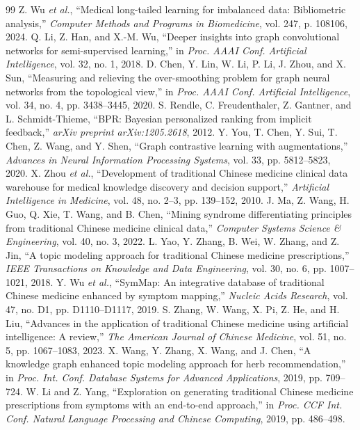 \documentclass[journal,twoside,web]{ieeecolor}
\begin{document}
\begin{thebibliography}{99}
 Z. Wu \textit{et al.}, ``Medical long-tailed learning for imbalanced data: Bibliometric analysis,'' \textit{Computer Methods and Programs in Biomedicine}, vol. 247, p. 108106, 2024.
 Q. Li, Z. Han, and X.-M. Wu, ``Deeper insights into graph convolutional networks for semi-supervised learning,'' in \textit{Proc. AAAI Conf. Artificial Intelligence}, vol. 32, no. 1, 2018.
 D. Chen, Y. Lin, W. Li, P. Li, J. Zhou, and X. Sun, ``Measuring and relieving the over-smoothing problem for graph neural networks from the topological view,'' in \textit{Proc. AAAI Conf. Artificial Intelligence}, vol. 34, no. 4, pp. 3438--3445, 2020.
 S. Rendle, C. Freudenthaler, Z. Gantner, and L. Schmidt-Thieme, ``BPR: Bayesian personalized ranking from implicit feedback,'' \textit{arXiv preprint arXiv:1205.2618}, 2012.
 Y. You, T. Chen, Y. Sui, T. Chen, Z. Wang, and Y. Shen, ``Graph contrastive learning with augmentations,'' \textit{Advances in Neural Information Processing Systems}, vol. 33, pp. 5812--5823, 2020.
 X. Zhou \textit{et al.}, ``Development of traditional Chinese medicine clinical data warehouse for medical knowledge discovery and decision support,'' \textit{Artificial Intelligence in Medicine}, vol. 48, no. 2--3, pp. 139--152, 2010.
 J. Ma, Z. Wang, H. Guo, Q. Xie, T. Wang, and B. Chen, ``Mining syndrome differentiating principles from traditional Chinese medicine clinical data,'' \textit{Computer Systems Science \& Engineering}, vol. 40, no. 3, 2022.
 L. Yao, Y. Zhang, B. Wei, W. Zhang, and Z. Jin, ``A topic modeling approach for traditional Chinese medicine prescriptions,'' \textit{IEEE Transactions on Knowledge and Data Engineering}, vol. 30, no. 6, pp. 1007--1021, 2018.
 Y. Wu \textit{et al.}, ``SymMap: An integrative database of traditional Chinese medicine enhanced by symptom mapping,'' \textit{Nucleic Acids Research}, vol. 47, no. D1, pp. D1110--D1117, 2019.
 S. Zhang, W. Wang, X. Pi, Z. He, and H. Liu, ``Advances in the application of traditional Chinese medicine using artificial intelligence: A review,'' \textit{The American Journal of Chinese Medicine}, vol. 51, no. 5, pp. 1067--1083, 2023.
 X. Wang, Y. Zhang, X. Wang, and J. Chen, ``A knowledge graph enhanced topic modeling approach for herb recommendation,'' in \textit{Proc. Int. Conf. Database Systems for Advanced Applications}, 2019, pp. 709--724.
 W. Li and Z. Yang, ``Exploration on generating traditional Chinese medicine prescriptions from symptoms with an end-to-end approach,'' in \textit{Proc. CCF Int. Conf. Natural Language Processing and Chinese Computing}, 2019, pp. 486--498.

\end{thebibliography}
\end{document}
